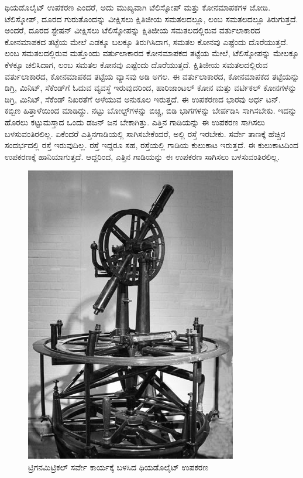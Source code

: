 ಥಿಯಡೊಲೈಟ್​ ಉಪಕರಣ ಎಂದರೆ, ಅದು ಮುಖ್ಯವಾಗಿ ಟೆಲಿಸ್ಕೋಪ್​ ಮತ್ತು ಕೋನಮಾಪಕಗಳ ಜೋಡಿ. ಟೆಲಿಸ್ಕೋಪ್​, ದೂರದ ಗುರುತೊಂದನ್ನು ವೀಕ್ಷಿಸಲು ಕ್ಷಿತಿಜೀಯ ಸಮತಲದಲ್ಲೂ, ಲಂಬ ಸಮತಲದಲ್ಲೂ ತಿರುಗುತ್ತದೆ. ಅಂದರೆ, ದೂರದ ಸ್ಟೇಷನ್​ ವೀಕ್ಷಿಸಲು ಟೆಲಿಸ್ಕೋಪನ್ನು ಕ್ಷಿತಿಜೀಯ ಸಮತಲದಲ್ಲಿರುವ ವರ್ತುಲಾಕಾರದ ಕೋನಮಾಪಕದ ತಟ್ಟೆಯ ಮೇಲೆ ಎಡಕ್ಕೂ ಬಲಕ್ಕೂ ತಿರುಗಿಸಿದಾಗ, ಸಮತಲ ಕೋನವು ಎಷ್ಟೆಂದು ದೊರೆಯುತ್ತದೆ. ಲಂಬ ಸಮತಲದಲ್ಲಿರುವ ಮತ್ತೊಂದು ವರ್ತುಲಾಕಾರದ ಕೋನಮಾಪಕದ ತಟ್ಟೆಯ ಮೇಲೆ, ಟೆಲಿಸ್ಕೋಪನ್ನು ಮೇಲಕ್ಕೂ ಕೆಳಕ್ಕೂ ಚಲಿಸಿದಾಗ, ಲಂಬ ಸಮತಲ ಕೋನವು ಎಷ್ಟೆಂದು ದೊರೆಯುತ್ತದೆ. ಕ್ಷಿತಿಜೀಯ ಸಮತಲದಲ್ಲಿರುವ ವರ್ತುಲಾಕಾರದ, ಕೋನಮಾಪಕದ ತಟ್ಟೆಯ ವ್ಯಾಸವು  ಅಡಿ ಅಗಲ. ಈ ವರ್ತುಲಾಕಾರದ, ಕೋನಮಾಪಕದ ತಟ್ಟೆಯನ್ನು ಡಿಗ್ರಿ, ಮಿನಿಟ್​, ಸೆಕೆಂಡ್​ಗೆ ಓದುವ ವ್ಯವಸ್ಥೆ ಇರುವುದರಿಂದ, ಹಾರಿಜಾಂಟಲ್​ ಕೋನ ಮತ್ತು ವರ್ಟಿಕಲ್​ ಕೋನಗಳನ್ನು ಡಿಗ್ರಿ, ಮಿನಿಟ್​, ಸೆಕೆಂಡ್​ ನಿಖರತೆಗೆ ಅಳೆಯುವ ಅನುಕೂಲ ಇರುತ್ತದೆ. ಈ ಉಪಕರಣದ ಭಾರವು ಅರ್ಧ ಟನ್​. ಕಬ್ಬಿಣ ಹಿತ್ತಾಳೆಯಿಂದ ಮಾಡಿದ್ದು. ನಟ್ಟು ಬೋಲ್ಟ್​ಗಳನ್ನು ಬಿಚ್ಚಿ, ಬಿಡಿ ಭಾಗಗಳನ್ನು ಬೇರ್ಪಡಿಸಿ ಸಾಗಿಸಬೇಕು. ಇದನ್ನು ಹೊರಲು ಕಟ್ಟುಮಸ್ತಾದ ಒಂದು ಡಜನ್​ ಜನ ಬೇಕಾಗಿತ್ತು. ಎತ್ತಿನ ಗಾಡಿಯನ್ನು ಈ ಉಪಕರಣ ಸಾಗಿಸಲು ಬಳಸುವಂತಿರಲಿಲ್ಲ. ಏಕೆಂದರೆ ಎತ್ತಿನಗಾಡಿಯಲ್ಲಿ ಸಾಗಿಸಬೇಕೆಂದರೆ, ಅಲ್ಲಿ ರಸ್ತೆ ಇರಬೇಕು. ಸರ್ವೇ ತಾಣಕ್ಕೆ ಹೆಚ್ಚಿನ ಸಂದರ್ಭದಲ್ಲಿ ರಸ್ತೆ ಇರುವುದಿಲ್ಲ. ರಸ್ತೆ ಇದ್ದರೂ ಸಹ, ರಸ್ತೆಯಲ್ಲಿ ಗಾಡಿಯ ಕುಲುಕಾಟ ಇರುತ್ತದೆ. ಈ ಕುಲುಕಾಟದಿಂದ ಉಪಕರಣಕ್ಕೆ ಹಾನಿಯಾಗುತ್ತದೆ. ಆದ್ದರಿಂದ, ಎತ್ತಿನ ಗಾಡಿಯನ್ನು ಈ ಉಪಕರಣ ಸಾಗಿಸಲು ಬಳಸುವಂತಿರಲಿಲ್ಲ.

\begin{figure}[!htbp]
\includegraphics{"images/image007.jpg"}
\caption{ಟ್ರಿಗನಮಿಟ್ರಿಕಲ್​ ಸರ್ವೇ ಕಾರ್ಯಕ್ಕೆ ಬಳಸಿದ ಥಿಯಡೊಲೈಟ್​ ಉಪಕರಣ}\label{chap5-fig1}
\end{figure}

